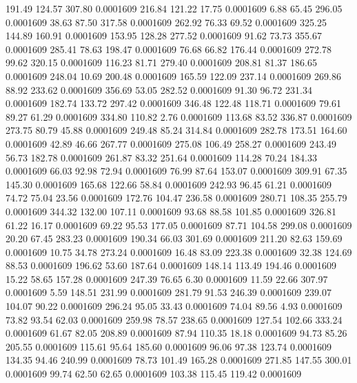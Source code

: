  191.49  124.57  307.80   0.0001609
 216.84  121.22   17.75   0.0001609
   6.88   65.45  296.05   0.0001609
  38.63   87.50  317.58   0.0001609
 262.92   76.33   69.52   0.0001609
 325.25  144.89  160.91   0.0001609
 153.95  128.28  277.52   0.0001609
  91.62   73.73  355.67   0.0001609
 285.41   78.63  198.47   0.0001609
  76.68   66.82  176.44   0.0001609
 272.78   99.62  320.15   0.0001609
 116.23   81.71  279.40   0.0001609
 208.81   81.37  186.65   0.0001609
 248.04   10.69  200.48   0.0001609
 165.59  122.09  237.14   0.0001609
 269.86   88.92  233.62   0.0001609
 356.69   53.05  282.52   0.0001609
  91.30   96.72  231.34   0.0001609
 182.74  133.72  297.42   0.0001609
 346.48  122.48  118.71   0.0001609
  79.61   89.27   61.29   0.0001609
 334.80  110.82    2.76   0.0001609
 113.68   83.52  336.87   0.0001609
 273.75   80.79   45.88   0.0001609
 249.48   85.24  314.84   0.0001609
 282.78  173.51  164.60   0.0001609
  42.89   46.66  267.77   0.0001609
 275.08  106.49  258.27   0.0001609
 243.49   56.73  182.78   0.0001609
 261.87   83.32  251.64   0.0001609
 114.28   70.24  184.33   0.0001609
  66.03   92.98   72.94   0.0001609
  76.99   87.64  153.07   0.0001609
 309.91   67.35  145.30   0.0001609
 165.68  122.66   58.84   0.0001609
 242.93   96.45   61.21   0.0001609
  74.72   75.04   23.56   0.0001609
 172.76  104.47  236.58   0.0001609
 280.71  108.35  255.79   0.0001609
 344.32  132.00  107.11   0.0001609
  93.68   88.58  101.85   0.0001609
 326.81   61.22   16.17   0.0001609
  69.22   95.53  177.05   0.0001609
  87.71  104.58  299.08   0.0001609
  20.20   67.45  283.23   0.0001609
 190.34   66.03  301.69   0.0001609
 211.20   82.63  159.69   0.0001609
  10.75   34.78  273.24   0.0001609
  16.48   83.09  223.38   0.0001609
  32.38  124.69   88.53   0.0001609
 196.62   53.60  187.64   0.0001609
 148.14  113.49  194.46   0.0001609
  15.22   58.65  157.28   0.0001609
 247.39   76.65    6.30   0.0001609
  11.59   22.66  307.97   0.0001609
   5.59  148.51  231.99   0.0001609
 281.79   91.53  246.39   0.0001609
 239.07  104.07   90.22   0.0001609
 296.24   95.05   33.43   0.0001609
  74.04   89.56    4.93   0.0001609
  73.82   93.54   62.03   0.0001609
 259.98   78.57  238.65   0.0001609
 127.54  102.66  333.24   0.0001609
  61.67   82.05  208.89   0.0001609
  87.94  110.35   18.18   0.0001609
  94.73   85.26  205.55   0.0001609
 115.61   95.64  185.60   0.0001609
  96.06   97.38  123.74   0.0001609
 134.35   94.46  240.99   0.0001609
  78.73  101.49  165.28   0.0001609
 271.85  147.55  300.01   0.0001609
  99.74   62.50   62.65   0.0001609
 103.38  115.45  119.42   0.0001609
